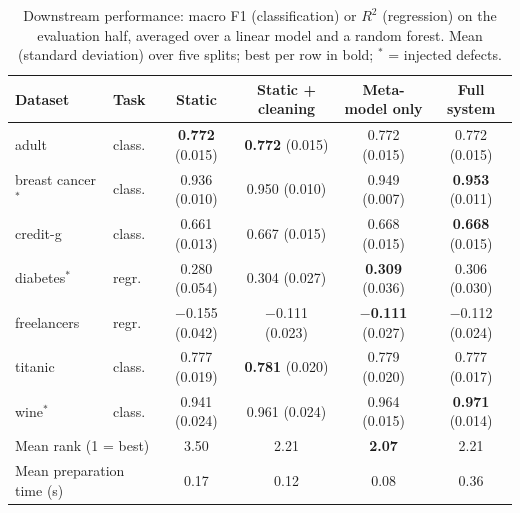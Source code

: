 \documentclass[11pt,a4paper]{article}
\begin{document}
\begin{table}[ht]
\centering
\small
\caption{Downstream performance: macro F1 (classification) or $R^2$ (regression) on the evaluation half, averaged over a linear model and a random forest. Mean (standard deviation) over five splits; best per row in bold; $^\ast$ = injected defects.}
\label{tab:results}
\setlength{\tabcolsep}{3.5pt}
\begin{tabular}{llcccc}
\toprule
\textbf{Dataset} & \textbf{Task} & \textbf{Static} & \textbf{Static + cleaning} & \textbf{Meta-model only} & \textbf{Full system} \\
\midrule
adult & class. & \textbf{0.772} (0.015) & \textbf{0.772} (0.015) & 0.772 (0.015) & 0.772 (0.015) \\
breast cancer$^\ast$ & class. & 0.936 (0.010) & 0.950 (0.010) & 0.949 (0.007) & \textbf{0.953} (0.011) \\
credit-g & class. & 0.661 (0.013) & 0.667 (0.015) & 0.668 (0.015) & \textbf{0.668} (0.015) \\
diabetes$^\ast$ & regr. & 0.280 (0.054) & 0.304 (0.027) & \textbf{0.309} (0.036) & 0.306 (0.030) \\
freelancers & regr. & $-$0.155 (0.042) & $-$0.111 (0.023) & \textbf{$-$0.111} (0.027) & $-$0.112 (0.024) \\
titanic & class. & 0.777 (0.019) & \textbf{0.781} (0.020) & 0.779 (0.020) & 0.777 (0.017) \\
wine$^\ast$ & class. & 0.941 (0.024) & 0.961 (0.024) & 0.964 (0.015) & \textbf{0.971} (0.014) \\
\midrule
\multicolumn{2}{l}{Mean rank (1 = best)} & 3.50 & 2.21 & \textbf{2.07} & 2.21 \\
\multicolumn{2}{l}{Mean preparation time (s)} & 0.17 & 0.12 & 0.08 & 0.36 \\
\bottomrule
\end{tabular}
\end{table}
\end{document}

